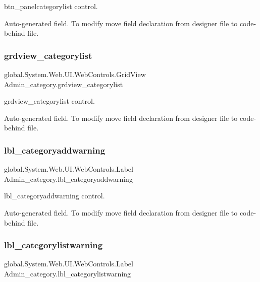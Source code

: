 btn\+\_\+panelcategorylist control. 

Auto-\/generated field. To modify move field declaration from designer file to code-\/behind file. \mbox{\label{class_admin__category_a77c0c00ee741aaa7c00dea7c1b9c553e}} 
\subsubsection{\texorpdfstring{grdview\_categorylist}{grdview\_categorylist}}
{\footnotesize\ttfamily global.\+System.\+Web.\+U\+I.\+Web\+Controls.\+Grid\+View Admin\+\_\+category.\+grdview\+\_\+categorylist\hspace{0.3cm}{\ttfamily [protected]}}



grdview\+\_\+categorylist control. 

Auto-\/generated field. To modify move field declaration from designer file to code-\/behind file. \mbox{\label{class_admin__category_af6c9842cceff2decdfd45ff5dd08fa4e}} 
\subsubsection{\texorpdfstring{lbl\_categoryaddwarning}{lbl\_categoryaddwarning}}
{\footnotesize\ttfamily global.\+System.\+Web.\+U\+I.\+Web\+Controls.\+Label Admin\+\_\+category.\+lbl\+\_\+categoryaddwarning\hspace{0.3cm}{\ttfamily [protected]}}



lbl\+\_\+categoryaddwarning control. 

Auto-\/generated field. To modify move field declaration from designer file to code-\/behind file. \mbox{\label{class_admin__category_a2f10c7d0aa94921f0a73bb2b18d021b8}} 
\subsubsection{\texorpdfstring{lbl\_categorylistwarning}{lbl\_categorylistwarning}}
{\footnotesize\ttfamily global.\+System.\+Web.\+U\+I.\+Web\+Controls.\+Label Admin\+\_\+category.\+lbl\+\_\+categorylistwarning\hspace{0.3cm}{\ttfamily [protected]}}



